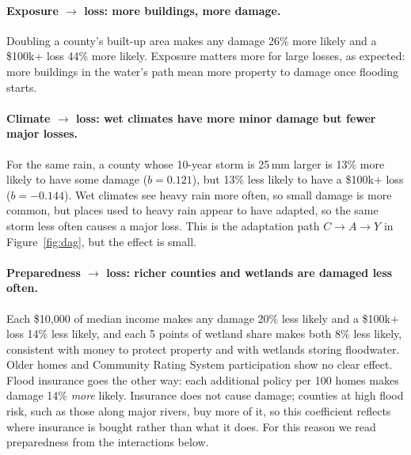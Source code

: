 \documentclass[10pt,twocolumn]{article}
\begin{document}
\paragraph{Exposure $\rightarrow$ loss: more buildings, more damage.} Doubling a county's
built-up area makes any damage 26\% more likely and a \$100k+ loss 44\% more likely. Exposure
matters more for large losses, as expected: more buildings in the water's path mean more
property to damage once flooding starts.

\paragraph{Climate $\rightarrow$ loss: wet climates have more minor damage but fewer major
losses.} For the same rain, a county whose 10-year storm is 25\,mm larger is 13\% more likely to
have some damage ($b = 0.121$), but 13\% less likely to have a \$100k+ loss ($b = -0.144$). Wet
climates see heavy rain more often, so small damage is more common, but places used to heavy rain
appear to have adapted, so the same storm less often causes a major loss. This is the adaptation
path $C \rightarrow A \rightarrow Y$ in Figure~\ref{fig:dag}, but the effect is small.

\paragraph{Preparedness $\rightarrow$ loss: richer counties and wetlands are damaged less often.}
Each \$10{,}000 of median income makes any damage 20\% less likely and a \$100k+ loss 14\% less
likely, and each 5 points of wetland share makes both 8\% less likely, consistent with money to
protect property and with wetlands storing floodwater. Older homes and Community Rating System
participation show no clear effect. Flood insurance goes the other way: each additional policy per
100 homes makes damage 14\% \emph{more} likely. Insurance does not cause damage; counties at high
flood risk, such as those along major rivers, buy more of it, so this coefficient reflects where
insurance is bought rather than what it does. For this reason we read preparedness from the
interactions below.
\end{document}
